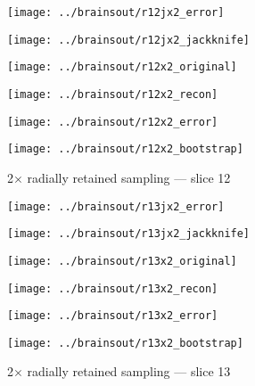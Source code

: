 \documentclass[review,supplement,onefignum,onetabnum,juq]{siamonline181217}
\begin{document}
\begin{figure}
\begin{centering}

\parbox{\imsize}{\texttt{[image: ../brainsout/r12jx2\_error]}}
\parbox{\imsize}{\texttt{[image: ../brainsout/r12jx2\_jackknife]}}

\vspace{\vertsep}

\parbox{\imsize}{\texttt{[image: ../brainsout/r12x2\_original]}}
\parbox{\imsize}{\texttt{[image: ../brainsout/r12x2\_recon]}}

\vspace{\vertsep}

\parbox{\imsize}{\texttt{[image: ../brainsout/r12x2\_error]}}
\parbox{\imsize}{\texttt{[image: ../brainsout/r12x2\_bootstrap]}}

\end{centering}
\caption{2$\times$ radially retained sampling --- slice 12}
\end{figure}


\begin{figure}
\begin{centering}

\parbox{\imsize}{\texttt{[image: ../brainsout/r13jx2\_error]}}
\parbox{\imsize}{\texttt{[image: ../brainsout/r13jx2\_jackknife]}}

\vspace{\vertsep}

\parbox{\imsize}{\texttt{[image: ../brainsout/r13x2\_original]}}
\parbox{\imsize}{\texttt{[image: ../brainsout/r13x2\_recon]}}

\vspace{\vertsep}

\parbox{\imsize}{\texttt{[image: ../brainsout/r13x2\_error]}}
\parbox{\imsize}{\texttt{[image: ../brainsout/r13x2\_bootstrap]}}

\end{centering}
\caption{2$\times$ radially retained sampling --- slice 13}
\end{figure}
\end{document}
